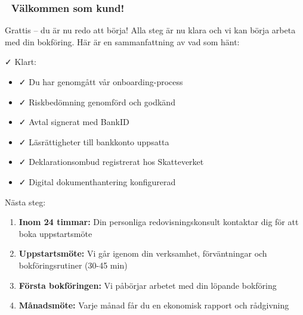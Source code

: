\documentclass[10pt]{beamer}
\begin{document}
\begin{frame}[fragile]
  \frametitle{🎉 Välkommen som kund!}

  \begin{block}{Grattis – du är nu redo att börja!}
    \vspace{0.2cm}
    Alla steg är nu klara och vi kan börja arbeta med din bokföring.
    Här är en sammanfattning av vad som hänt:
  \end{block}

  \vspace{0.4cm}

  \begin{block}{✓ Klart:}
    \footnotesize
    \begin{itemize}
      \item ✓ Du har genomgått vår onboarding-process
      \item ✓ Riskbedömning genomförd och godkänd
      \item ✓ Avtal signerat med BankID
      \item ✓ Läsrättigheter till bankkonto uppsatta
      \item ✓ Deklarationsombud registrerat hos Skatteverket
      \item ✓ Digital dokumenthantering konfigurerad
    \end{itemize}
  \end{block}

  \vspace{0.4cm}

  \begin{block}{Nästa steg:}
    \footnotesize
    \begin{enumerate}
      \item \textbf{Inom 24 timmar:} Din personliga redovisningskonsult kontaktar dig för att boka uppstartsmöte
      \item \textbf{Uppstartsmöte:} Vi går igenom din verksamhet, förväntningar och bokföringsrutiner (30-45 min)
      \item \textbf{Första bokföringen:} Vi påbörjar arbetet med din löpande bokföring
      \item \textbf{Månadsmöte:} Varje månad får du en ekonomisk rapport och rådgivning
    \end{enumerate}
  \end{block}

  \vspace{0.4cm}


\end{frame}
\end{document}
